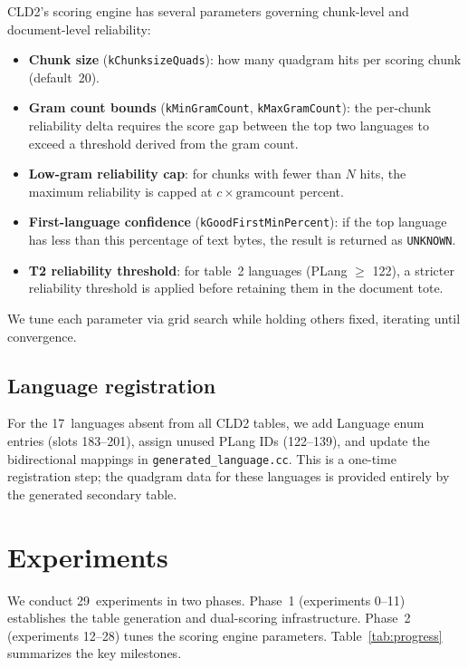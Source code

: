 \documentclass{article}
\begin{document}
CLD2's scoring engine has several parameters governing chunk-level and document-level reliability:
\begin{itemize}
\item \textbf{Chunk size} (\texttt{kChunksizeQuads}): how many quadgram hits per scoring chunk (default~20).
\item \textbf{Gram count bounds} (\texttt{kMinGramCount}, \texttt{kMaxGramCount}): the per-chunk reliability delta requires the score gap between the top two languages to exceed a threshold derived from the gram count.
\item \textbf{Low-gram reliability cap}: for chunks with fewer than $N$ hits, the maximum reliability is capped at $c \times \text{gramcount}$ percent.
\item \textbf{First-language confidence} (\texttt{kGoodFirstMinPercent}): if the top language has less than this percentage of text bytes, the result is returned as \texttt{UNKNOWN}.
\item \textbf{T2 reliability threshold}: for table~2 languages (PLang $\geq$ 122), a stricter reliability threshold is applied before retaining them in the document tote.
\end{itemize}

We tune each parameter via grid search while holding others fixed, iterating until convergence.

\subsection{Language registration}

For the 17~languages absent from all CLD2 tables, we add Language enum entries (slots 183--201), assign unused PLang IDs (122--139), and update the bidirectional mappings in \texttt{generated\_language.cc}.
This is a one-time registration step; the quadgram data for these languages is provided entirely by the generated secondary table.

\section{Experiments}
\label{sec:experiments}

We conduct 29~experiments in two phases.
Phase~1 (experiments 0--11) establishes the table generation and dual-scoring infrastructure.
Phase~2 (experiments 12--28) tunes the scoring engine parameters.
Table~\ref{tab:progress} summarizes the key milestones.
\end{document}
